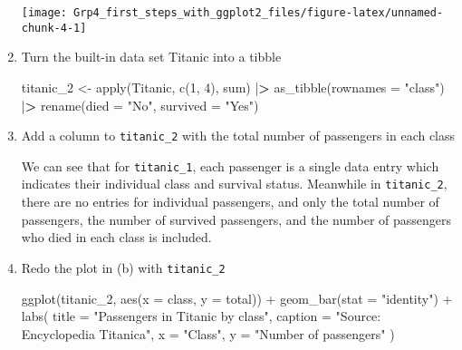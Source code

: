 \documentclass[
]{article}
\newenvironment{Shaded}{\begin{snugshade}}{\end{snugshade}}
\newcommand{\AttributeTok}[1]{\textcolor[rgb]{0.77,0.63,0.00}{#1}}
\newcommand{\DecValTok}[1]{\textcolor[rgb]{0.00,0.00,0.81}{#1}}
\newcommand{\ErrorTok}[1]{\textcolor[rgb]{0.64,0.00,0.00}{\textbf{#1}}}
\newcommand{\FunctionTok}[1]{\textcolor[rgb]{0.00,0.00,0.00}{#1}}
\newcommand{\NormalTok}[1]{#1}
\newcommand{\OtherTok}[1]{\textcolor[rgb]{0.56,0.35,0.01}{#1}}
\newcommand{\SpecialCharTok}[1]{\textcolor[rgb]{0.00,0.00,0.00}{#1}}
\newcommand{\StringTok}[1]{\textcolor[rgb]{0.31,0.60,0.02}{#1}}
\begin{document}
\begin{enumerate}
  \begin{center}\texttt{[image: Grp4\_first\_steps\_with\_ggplot2\_files/figure-latex/unnamed-chunk-4-1]} \end{center}
\item
  Turn the built-in data set Titanic into a tibble

\begin{Shaded}
\begin{Highlighting}[]
\NormalTok{  titanic\_2 }\OtherTok{\textless{}{-}}
  \FunctionTok{apply}\NormalTok{(Titanic, }\FunctionTok{c}\NormalTok{(}\DecValTok{1}\NormalTok{, }\DecValTok{4}\NormalTok{), sum) }\SpecialCharTok{|}\ErrorTok{\textgreater{}}
  \FunctionTok{as\_tibble}\NormalTok{(}\AttributeTok{rownames =} \StringTok{"class"}\NormalTok{) }\SpecialCharTok{|}\ErrorTok{\textgreater{}}
  \FunctionTok{rename}\NormalTok{(}\AttributeTok{died =} \StringTok{"No"}\NormalTok{, }\AttributeTok{survived =} \StringTok{"Yes"}\NormalTok{)}
\end{Highlighting}
\end{Shaded}
\item
  Add a column to \texttt{titanic\_2} with the total number of
  passengers in each class

\begin{Shaded}
\end{Shaded}

  We can see that for \texttt{titanic\_1}, each passenger is a single
  data entry which indicates their individual class and survival status.
  Meanwhile in \texttt{titanic\_2}, there are no entries for individual
  passengers, and only the total number of passengers, the number of
  survived passengers, and the number of passengers who died in each
  class is included.
\item
  Redo the plot in (b) with \texttt{titanic\_2}

\begin{Shaded}
\begin{Highlighting}[]
  \FunctionTok{ggplot}\NormalTok{(titanic\_2, }\FunctionTok{aes}\NormalTok{(}\AttributeTok{x =}\NormalTok{ class, }\AttributeTok{y =}\NormalTok{ total)) }\SpecialCharTok{+}
  \FunctionTok{geom\_bar}\NormalTok{(}\AttributeTok{stat =} \StringTok{"identity"}\NormalTok{) }\SpecialCharTok{+}
  \FunctionTok{labs}\NormalTok{(}
    \AttributeTok{title =} \StringTok{"Passengers in Titanic by class"}\NormalTok{,}
    \AttributeTok{caption =} \StringTok{"Source: Encyclopedia Titanica"}\NormalTok{,}
    \AttributeTok{x =} \StringTok{"Class"}\NormalTok{,}
    \AttributeTok{y =} \StringTok{"Number of passengers"}
\NormalTok{    )}
\end{Highlighting}
\end{Shaded}


\end{enumerate}
\end{document}
